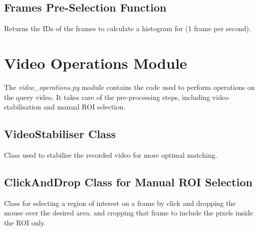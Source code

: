 \subsection{Frames Pre-Selection Function}
\label{sec:code-get_frames_to_process}

Returns the IDs of the frames to calculate a histogram for (1 frame per second).




\clearpage
\section{Video Operations Module}

The \textit{video\_operations.py} module contains the code used to perform operations on the query video. It takes care of the pre-processing steps, including video stabilisation and manual ROI selection. 


\subsection{VideoStabiliser Class}
\label{sec:code-VideoStabiliser}

Class used to stabilise the recorded video for more optimal matching.




\subsection{ClickAndDrop Class for Manual ROI Selection}
\label{sec:code-ClickAndDrop}

Class for selecting a region of interest on a frame by click and dropping the mouse over the desired area, and cropping that frame to include the pixels inside the ROI only.




